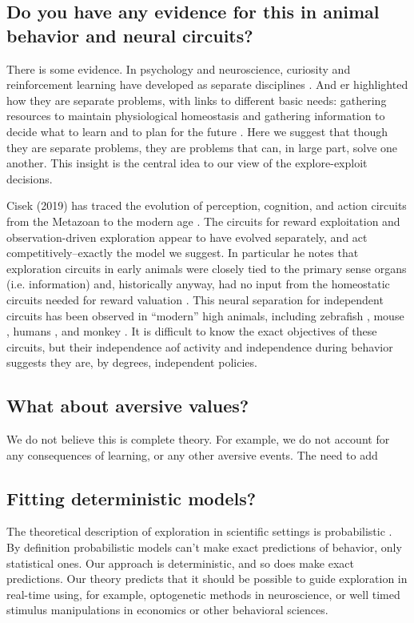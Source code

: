 \subsection*{Do you have any evidence for this in animal behavior and neural circuits?}
There is some evidence. In psychology and neuroscience, curiosity and reinforcement learning have developed as separate disciplines \cite{Berlyne1950,Kidd2015,Sutton2018}. And er highlighted how they are separate problems, with links to different basic needs: gathering resources to maintain physiological homeostasis \cite{Keramati2014,Juechems2019} and gathering information to decide what to learn and to plan for the future \cite{Valiant1984,Sutton2018}. Here we suggest that though they are separate problems, they are problems that can, in large part, solve one another. This insight is the central idea to our view of the explore-exploit decisions. 

Cisek (2019) has traced the evolution of perception, cognition, and action circuits from the Metazoan to the modern age \cite{Cisek2019}. The circuits for reward exploitation and observation-driven exploration appear to have evolved separately, and act competitively--exactly the model we suggest. In particular he notes that exploration circuits in early animals were closely tied to the primary sense organs (i.e. information) and, historically anyway, had no input from the homeostatic circuits needed for reward valuation \cite{Keramati2014,Cisek2019,Juechems2019}. This neural separation for independent circuits has been observed in ``modern'' high animals, including zebrafish \cite{needed}, mouse \cite{needed}, humans \cite{needed}, and monkey \cite{White2019,Wang2019}. It is difficult to know the exact objectives of these circuits, but their independence aof activity and independence during behavior suggests they are, by degrees, independent policies.


\subsection*{What about aversive values?}
We do not believe this is complete theory. For example, we do not account for any consequences of learning, or any other aversive events. The need to add 


\subsection*{Fitting deterministic models?}
The theoretical description of exploration in scientific settings is probabilistic \cite{Calhoun2014,Song2019a,Gershman2018b,Schulz2018a}. By definition probabilistic models can't make exact predictions of behavior, only statistical ones. Our approach is deterministic, and so does make exact predictions. Our theory predicts that it should be possible to guide exploration in real-time using, for example, optogenetic methods in neuroscience, or well timed stimulus manipulations in economics or other behavioral sciences. 

